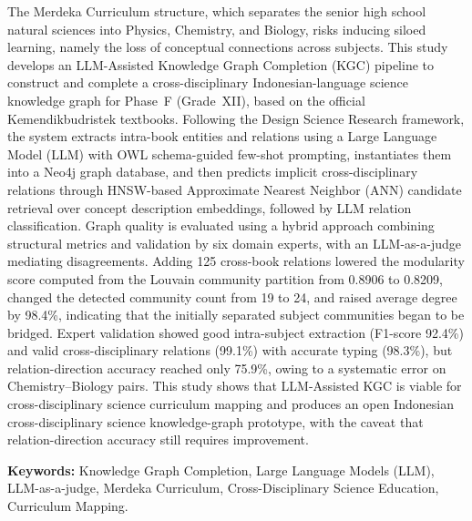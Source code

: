 \documentclass[../../thesis]{subfiles}
\begin{document}
\noindent The Merdeka Curriculum structure, which separates the senior high
school natural sciences into Physics, Chemistry, and Biology, risks inducing
siloed learning, namely the loss of conceptual connections across
subjects. This study develops an LLM-Assisted Knowledge Graph
Completion (KGC) pipeline to construct and complete a cross-disciplinary
Indonesian-language science knowledge graph for Phase~F (Grade~XII), based on
the official Kemendikbudristek textbooks. Following the Design Science
Research framework, the system extracts intra-book entities and relations using
a Large Language Model (LLM) with OWL schema-guided few-shot prompting,
instantiates them into a Neo4j graph database, and then predicts implicit
cross-disciplinary relations through HNSW-based Approximate Nearest Neighbor (ANN)
candidate retrieval over concept description embeddings, followed by LLM
relation classification. Graph quality is evaluated using a hybrid approach
combining structural metrics and validation by six domain experts, with an
LLM-as-a-judge mediating disagreements. Adding 125 cross-book relations lowered
the modularity score computed from the Louvain community partition from 0.8906
to 0.8209, changed the detected community count from 19 to 24, and raised
average degree by 98.4\%, indicating that the initially separated subject
communities began to be bridged.
Expert validation showed good intra-subject extraction (F1-score 92.4\%) and
valid cross-disciplinary relations (99.1\%) with accurate typing (98.3\%), but
relation-direction accuracy reached only 75.9\%, owing to a systematic error on
Chemistry--Biology pairs. This study shows that LLM-Assisted KGC is viable for
cross-disciplinary science curriculum mapping and produces an open Indonesian
cross-disciplinary science knowledge-graph prototype, with the caveat that
relation-direction accuracy still requires improvement.
\vspace{0.6cm}

\noindent\textbf{Keywords:} Knowledge Graph Completion, Large Language Models
(LLM), LLM-as-a-judge, Merdeka Curriculum, Cross-Disciplinary Science Education,
Curriculum Mapping.
\end{document}
